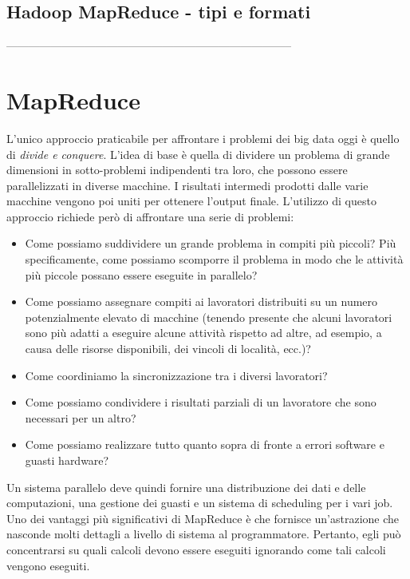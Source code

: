 \documentclass{article}
\begin{document}
\subsection{Hadoop MapReduce - tipi e formati}

-----------------------------------------------------------------------------

\section{MapReduce}
L'unico approccio praticabile per affrontare i problemi dei big data oggi è quello di \textit{divide e conquere}. L'idea di base è quella di dividere un problema di grande dimensioni in sotto-problemi indipendenti tra loro, che possono essere parallelizzati in diverse macchine. I risultati intermedi prodotti dalle varie macchine vengono poi uniti per ottenere l'output finale. L'utilizzo di questo approccio richiede però di affrontare una serie di problemi:
\begin{itemize}
    \item Come possiamo suddividere un grande problema in compiti più piccoli? Più specificamente, come possiamo scomporre il problema in modo che le attività più piccole possano essere eseguite in parallelo?
    \item Come possiamo assegnare compiti ai lavoratori distribuiti su un numero potenzialmente elevato di macchine (tenendo presente che alcuni lavoratori sono più adatti a eseguire alcune attività rispetto ad altre, ad esempio, a causa delle risorse disponibili, dei vincoli di località, ecc.)?
    \item Come coordiniamo la sincronizzazione tra i diversi lavoratori?
    \item Come possiamo condividere i risultati parziali di un lavoratore che sono necessari per un altro?
    \item Come possiamo realizzare tutto quanto sopra di fronte a errori software e guasti hardware?
\end{itemize}

\noindent Un sistema parallelo deve quindi fornire una distribuzione dei dati e delle computazioni, una gestione dei guasti e un sistema di scheduling per i vari job. Uno dei vantaggi più significativi di MapReduce è che fornisce un'astrazione che nasconde molti dettagli a livello di sistema al programmatore. Pertanto, egli può concentrarsi su quali calcoli devono essere eseguiti ignorando come tali calcoli vengono eseguiti. 
\end{document}
